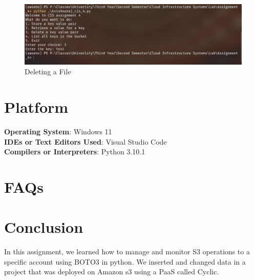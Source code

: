 \documentclass[11pt]{article}
\begin{document}
\begin{figure}[H]
    \centering
    \includegraphics[width=.95\textwidth]{delete.png}
    \caption{Deleting a File}
\end{figure}

\section{Platform}
\textbf{Operating System}: Windows 11 \\
\textbf{IDEs or Text Editors Used}: Visual Studio Code\\
\textbf{Compilers or Interpreters}: Python 3.10.1\\

% 

\section{FAQs}


\section{Conclusion}
In this assignment, we learned how to manage and monitor S3 operations to a specific account using BOTO3 in python. We inserted and changed data in a project that was deployed on Amazon s3 using a PaaS called Cyclic.
\clearpage

\pagebreak
\begin{thebibliography}{}

\end{thebibliography}
\end{document}
